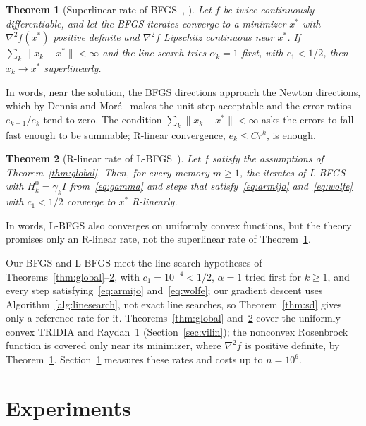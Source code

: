 \documentclass[11pt,a4paper]{amsart}
\numberwithin{equation}{section}
\theoremstyle{plain}
\newtheorem{theorem}{Theorem}[section]
\theoremstyle{definition}
\theoremstyle{remark}
\newcommand{\grad}{\nabla}
\newcommand{\norm}[1]{\lVert #1 \rVert}
\begin{document}
\begin{theorem}[Superlinear rate of BFGS~{\cite{dennis1977}, \cite[Theorem~6.6]{nocedal2006}}]%
\label{thm:superlinear}
Let $f$ be twice continuously differentiable, and let the BFGS iterates
converge to a minimizer $x^*$ with $\grad^2 f(x^*)$ positive definite
and $\grad^2 f$ Lipschitz continuous near $x^*$. If
$\sum_k \norm{x_k - x^*} < \infty$ and the line search tries
$\alpha_k = 1$ first, with $c_1 < 1/2$, then $x_k \to x^*$
superlinearly.
\end{theorem}

In words, near the solution, the BFGS directions approach the Newton
directions, which by Dennis and Moré~\cite{dennis1977} makes the unit
step acceptable and the error ratios $e_{k+1}/e_k$ tend to zero. The
condition $\sum_k \norm{x_k - x^*} < \infty$ asks the errors to fall
fast enough to be summable; R-linear convergence, $e_k \leq C r^k$, is
enough.

\begin{theorem}[R-linear rate of L-BFGS~{\cite{liu1989}}]\label{thm:lbfgs}
Let $f$ satisfy the assumptions of Theorem~\ref{thm:global}. Then, for
every memory $m \geq 1$, the iterates of L-BFGS with
$H_k^0 = \gamma_k I$ from~\eqref{eq:gamma} and steps that
satisfy~\eqref{eq:armijo} and~\eqref{eq:wolfe} with $c_1 < 1/2$
converge to $x^*$ R-linearly.
\end{theorem}

In words, L-BFGS also converges on uniformly convex functions, but the
theory promises only an R-linear rate, not the superlinear rate of
Theorem~\ref{thm:superlinear}.

Our BFGS and L-BFGS meet the line-search hypotheses of
Theorems~\ref{thm:global}--\ref{thm:lbfgs}, with
$c_1 = 10^{-4} < 1/2$, $\alpha = 1$ tried first for $k \geq 1$, and
every step satisfying~\eqref{eq:armijo} and~\eqref{eq:wolfe}; our
gradient descent uses Algorithm~\ref{alg:linesearch}, not exact line
searches, so Theorem~\ref{thm:sd} gives only a reference rate for it.
Theorems~\ref{thm:global} and~\ref{thm:lbfgs} cover the uniformly
convex TRIDIA and Raydan~1 (Section~\ref{sec:vilin}); the nonconvex
Rosenbrock function is covered only near its minimizer, where
$\grad^2 f$ is positive definite, by Theorem~\ref{thm:superlinear}.
Section~\ref{sec:experiments} measures these rates and costs up to
$n = 10^6$.

\section{Experiments}\label{sec:experiments}
\end{document}
